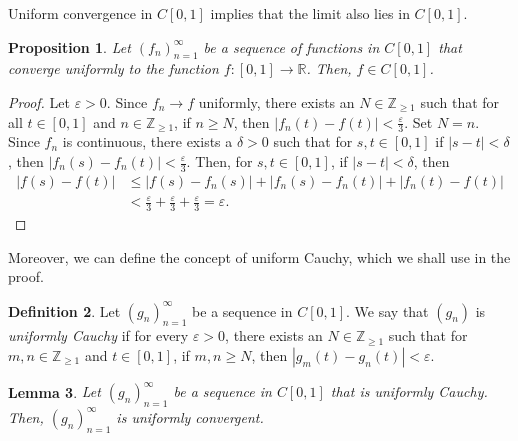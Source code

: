 \documentclass[a4paper, openany]{memoir}
\theoremstyle{definition}
\newtheorem{definition}{Definition}[section]
\theoremstyle{plain}
\newtheorem{lemma}[definition]{Lemma}
\newtheorem{proposition}[definition]{Proposition}
\begin{document}
    Uniform convergence in $C[0, 1]$ implies that the limit also lies in $C[0, 1]$.
    \begin{proposition}
        Let $(f_n)_{n=1}^\infty$ be a sequence of functions in $C[0, 1]$ that converge uniformly to the function $f \colon [0, 1] \to \mathbb{R}$. Then, $f \in C[0, 1]$.
    \end{proposition}
    \begin{proof}
        Let $\varepsilon > 0$. Since $f_n \to f$ uniformly, there exists an $N \in \mathbb{Z}_{\geq 1}$ such that for all $t \in [0, 1]$ and $n \in \mathbb{Z}_{\geq 1}$, if $n \geq N$, then $|f_n(t) - f(t)| < \frac{\varepsilon}{3}$. Set $N = n$. Since $f_n$ is continuous, there exists a $\delta > 0$ such that for $s, t \in [0, 1]$ if $|s - t| < \delta$, then $|f_n(s) - f_n(t)| < \frac{\varepsilon}{3}$. Then, for $s, t \in [0, 1]$, if $|s - t| < \delta$, then
        \begin{align*}
            |f(s) - f(t)| &\leq |f(s) - f_n(s)| + |f_n(s) - f_n(t)| + |f_n(t) - f(t)| \\
            &< \frac{\varepsilon}{3} + \frac{\varepsilon}{3} + \frac{\varepsilon}{3} = \varepsilon.
        \end{align*}
    \end{proof}
    \noindent Moreover, we can define the concept of uniform Cauchy, which we shall use in the proof.
    \begin{definition}
        Let $(g_n)_{n=1}^\infty$ be a sequence in $C[0, 1]$. We say that $(g_n)$ is \emph{uniformly Cauchy} if for every $\varepsilon > 0$, there exists an $N \in \mathbb{Z}_{\geq 1}$ such that for $m, n \in \mathbb{Z}_{\geq 1}$ and $t \in [0, 1]$, if $m, n \geq N$, then $|g_m(t) - g_n(t)| < \varepsilon$.
    \end{definition}
    \begin{lemma}
        Let $(g_n)_{n=1}^\infty$ be a sequence in $C[0, 1]$ that is uniformly Cauchy. Then, $(g_n)_{n=1}^\infty$ is uniformly convergent.
    \end{lemma}
\end{document}
